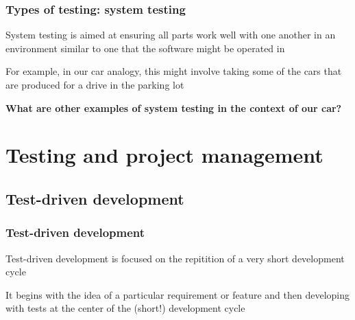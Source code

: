 \documentclass[10pt]{beamer}
\begin{document}
  \begin{frame} \frametitle{Types of testing: system testing}

    System testing is aimed at ensuring all parts work well with one another in an
    environment similar to one that the software might be operated in

    \vspace{0.25cm}

    For example, in our car analogy, this might involve taking some of the cars that
    are produced for a drive in the parking lot

    \vspace{0.25cm}

    \textbf{What are other examples of system testing in the context of our car?}

  \end{frame}


\section{Testing and project management}

  \subsection{Test-driven development}

  \begin{frame} \frametitle{Test-driven development}

    Test-driven development is focused on the repitition of a very short development cycle

    It begins with the idea of a particular requirement or feature and then developing
    with tests at the center of the (short!) development cycle

  \end{frame}
\end{document}
